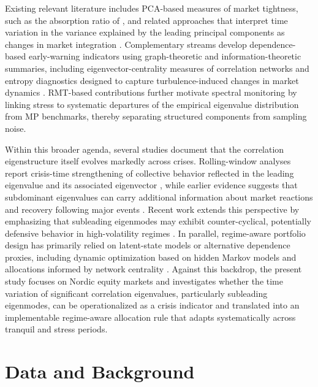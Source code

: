 \documentclass[pdflatex,sn-basic]{sn-jnl}%
\theoremstyle{thmstyleone}%
\theoremstyle{thmstyletwo}%
\theoremstyle{thmstylethree}%
\begin{document}
Existing relevant literature includes PCA-based measures of market tightness, such as 
the absorption ratio of \citet{kritzman2010principal}, and related approaches that 
interpret time variation in the variance explained by the leading principal components 
as changes in market integration \citep{volosovych2013learning}. Complementary streams 
develop dependence-based early-warning indicators using graph-theoretic and information-theoretic 
summaries, including eigenvector-centrality measures of correlation networks \citep{ciciretti2025early} 
and entropy diagnostics designed to capture turbulence-induced changes in market dynamics \citep{chakraborti2020phase, olbrys2022regularity}. RMT-based contributions further motivate spectral 
monitoring by linking stress to systematic departures of the empirical eigenvalue distribution from 
MP benchmarks, thereby separating structured components from sampling noise.

Within this broader agenda, several studies document that the correlation eigenstructure itself 
evolves markedly across crises. Rolling-window analyses report crisis-time strengthening of collective 
behavior reflected in the leading eigenvalue and its associated eigenvector \citep{junior2012correlation, song2011evolution}, 
while earlier evidence suggests that subdominant eigenvalues can carry additional information about market 
reactions and recovery following major events \citep{sharkasi2006reaction}. Recent work extends this perspective 
by emphasizing that subleading eigenmodes may exhibit counter-cyclical, potentially defensive behavior in 
high-volatility regimes \citep{molero2025random}. In parallel, regime-aware portfolio design has primarily 
relied on latent-state models or alternative dependence proxies, including dynamic optimization based on hidden Markov models \citep{nystrup2018dynamic} and allocations informed by network centrality \citep{ciciretti2023building}. 
Against this backdrop, the present study focuses on Nordic equity markets and investigates whether 
the time variation of significant correlation eigenvalues, particularly subleading eigenmodes, can be 
operationalized as a crisis indicator and translated into an implementable regime-aware allocation 
rule that adapts systematically across tranquil and stress periods.

\section{Data and Background}
\label{sec:data}
\end{document}
